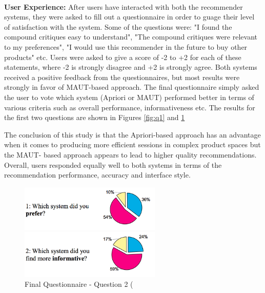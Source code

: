 \\
\textbf{User Experience:}
After users have interacted with both the recommender systems, they were asked to fill out a questionnaire in order to guage their level of satisfaction with the system.
Some of the questions were: "I found the compound critiques easy to understand", "The compound critiques were relevant to my preferences", "I would use this recommender in the future to buy other products" etc.
Users were asked to give a score of -2 to +2 for each of these statements, where -2 is strongly disagree and +2 is strongly agree.
Both systems received a positive feedback from the questionnaires, but most results were strongly in favor of MAUT-based approach.
The final questionnaire simply asked the user to vote which system (Apriori or MAUT) performed better in terms of various criteria such as overall performance, informativeness etc. The results for the first two questions are shown in Figures \ref{fig:q1} and \ref{fig:q2}

The conclusion of this study is that the Apriori-based approach has an advantage when it comes to producing more efficient sessions in complex product spaces but the MAUT- based approach appears to lead to higher quality recommendations. 
Overall, users responded equally well to both systems in terms of the recommendation performance, accuracy and interface style.

\begin{figure}
  \centering
  \captionsetup{justification=centering}
    \includegraphics[width=0.6\textwidth]{figures-bharath/firstQ_liveUser.png}
  \caption{Final Questionnaire - Question 1 \\(Blue - Apriori, Red - MAUT, Yellow - No difference)(\cite{liveUserStudy}}
\label{fig:q1}
    \includegraphics[width=0.6\textwidth]{figures-bharath/secondQ_liveUser.png}
  \caption{Final Questionnaire - Question 2 (\cite{liveUserStudy}}
\label{fig:q2}
\end{figure}
